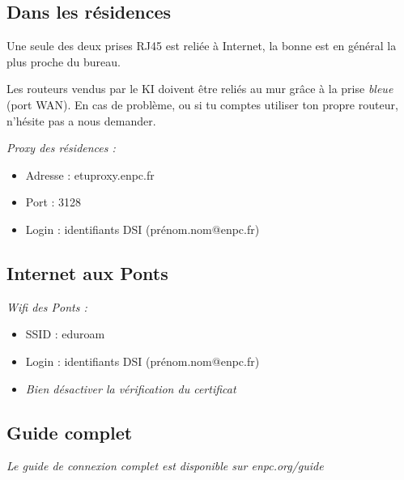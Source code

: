 \documentclass{../templates/enpc-ki/ki020}
\begin{document}
    \vspace{2cm}
    \begin{kiframe}
      \subsection{Dans les résidences} %
        Une seule des deux prises RJ45 est reliée à Internet, la bonne est en général la plus proche du bureau.

        Les routeurs vendus par le KI doivent être reliés au mur grâce à la prise \emph{bleue} (port WAN). En cas de problème, ou si tu comptes utiliser ton propre routeur, n'hésite pas a nous demander.

        \begin{flushleft}
          \emph{Proxy des résidences :}
          \begin{itemize}
            \item Adresse : etuproxy.enpc.fr
            \item Port : 3128
            \item Login : identifiants DSI (prénom.nom@enpc.fr)
          \end{itemize}
        \end{flushleft}

      \subsection{Internet aux Ponts}
        \begin{flushleft}
          \emph{Wifi des Ponts :}
          \begin{itemize}
            \item SSID : eduroam
            \item Login : identifiants DSI (prénom.nom@enpc.fr)
            \item \emph{Bien désactiver la vérification du certificat}
          \end{itemize}
        \end{flushleft}

\subsection{Guide complet}
  \begin{flushleft}
    \emph{Le guide de connexion complet est disponible sur enpc.org/guide}
  \end{flushleft}
      \end{kiframe}
\end{document}
